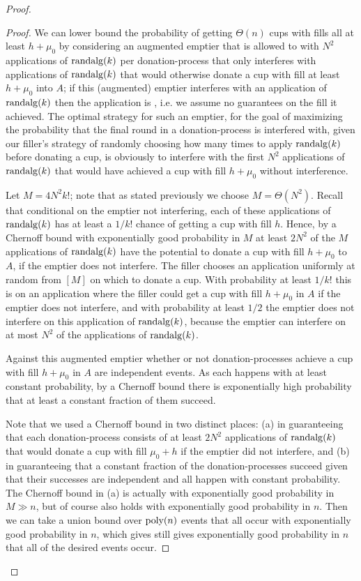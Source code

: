 \begin{proof}
\begin{proof}
  We can lower bound the probability of getting $\Theta(n)$ cups
  with fills all at least $h + \mu_0$ by considering an augmented
  emptier that is allowed to  with $N^2$
  applications of $\operatorname{\text{\textup{randalg}}}(k)$ per donation-process that only
  interferes with applications of $\operatorname{\text{\textup{randalg}}}(k)$ that would
  otherwise donate a cup with fill at least $h + \mu_0$ into $A$;
  if this (augmented) emptier interferes with an application of
  $\operatorname{\text{\textup{randalg}}}(k)$ then the application is , i.e.
  we assume no guarantees on the fill it achieved.
  The optimal strategy for such an emptier, for the goal of
  maximizing the probability that the final round in a
  donation-process is interfered with, given our filler's
  strategy of randomly choosing how many times to apply
  $\operatorname{\text{\textup{randalg}}}(k)$ before donating a cup, is obviously to interfere
  with the first $N^2$ applications of $\operatorname{\text{\textup{randalg}}}(k)$ that would
  have achieved a cup with fill $h+\mu_0$ without interference. 

  Let $M = 4N^2 k!$; note that as stated previously we choose $M=\Theta(N^2)$. 
  Recall that conditional on the
  emptier not interfering, each of these applications of
  $\operatorname{\text{\textup{randalg}}}(k)$ has at least a $1/k!$ chance of getting a cup
  with fill $h$. Hence, by a Chernoff bound with exponentially
  good probability in $M$ at least $2N^2$ of the $M$ applications of
  $\operatorname{\text{\textup{randalg}}}(k)$ have the potential to donate a cup with fill
  $h+\mu_0$ to $A$, if the emptier does not interfere. The filler
  chooses an application uniformly at random from $[M]$ on which
  to donate a cup. With probability at least $1/k!$ this is on an
  application where the filler could get a cup with fill
  $h+\mu_0$ in $A$ if the emptier does not interfere, and with
  probability at least $1/2$ the emptier does not interfere on
  this application of $\operatorname{\text{\textup{randalg}}}(k)$, because the emptier can
  interfere on at most $N^2$ of the applications of $\operatorname{\text{\textup{randalg}}}(k)$. 

  Against this augmented emptier whether or not
  donation-processes achieve a cup with fill $h+\mu_0$ in $A$ are
  independent events. As each happens with at least constant
  probability, by a Chernoff bound there is exponentially high
  probability that at least a constant fraction of them succeed.

  Note that we used a Chernoff bound in two distinct places: (a)
  in guaranteeing that each donation-process consists of at least
  $2N^2$ applications of $\operatorname{\text{\textup{randalg}}}(k)$ that would donate a cup with
  fill $\mu_0 + h$ if the emptier did not interfere, and (b) in
  guaranteeing that a constant fraction of the donation-processes
  succeed given that their successes are independent and all
  happen with constant probability. The Chernoff bound in (a) is
  actually with exponentially good probability in $M \gg n$, but
  of course also holds with exponentially good probability in
  $n$. Then we can take a union bound over $\operatorname{\text{poly}}(n)$ events that
  all occur with exponentially good probability in $n$, which
  gives still gives exponentially good
  probability in $n$ that all of the desired events occur.


\end{proof}
\end{proof}
